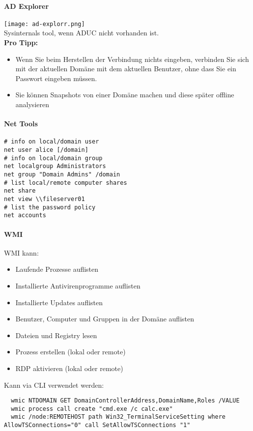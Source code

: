 \paragraph{AD Explorer}
\texttt{[image: ad-explorr.png]}\\
Sysinternals tool, wenn ADUC nicht vorhanden ist.\\
\textbf{Pro Tipp:}\\
\begin{itemize}
  \item Wenn Sie beim Herstellen der Verbindung nichts eingeben, verbinden Sie sich mit der aktuellen Domäne mit dem aktuellen Benutzer, ohne dass Sie ein Passwort eingeben müssen.
  \item Sie können Snapshots von einer Domäne machen und diese später offline analysieren
\end{itemize}

\paragraph{Net Tools}
\begin{lstlisting}
# info on local/domain user
net user alice [/domain]
# info on local/domain group
net localgroup Administrators
net group "Domain Admins" /domain
# list local/remote computer shares
net share
net view \\fileserver01
# list the password policy
net accounts
\end{lstlisting}

\paragraph{WMI}
WMI kann:
\begin{itemize}
  \item Laufende Prozesse auflisten
  \item Installierte Antivirenprogramme auflisten
  \item Installierte Updates auflisten
  \item Benutzer, Computer und Gruppen in der Domäne auflisten
  \item Dateien und Registry lesen
  \item Prozess erstellen (lokal oder remote)
  \item RDP aktivieren (lokal oder remote)
\end{itemize}

Kann via CLI verwendet werden:
\begin{lstlisting}
  wmic NTDOMAIN GET DomainControllerAddress,DomainName,Roles /VALUE
  wmic process call create "cmd.exe /c calc.exe"
  wmic /node:REMOTEHOST path Win32_TerminalServiceSetting where AllowTSConnections="0" call SetAllowTSConnections "1"
\end{lstlisting}

